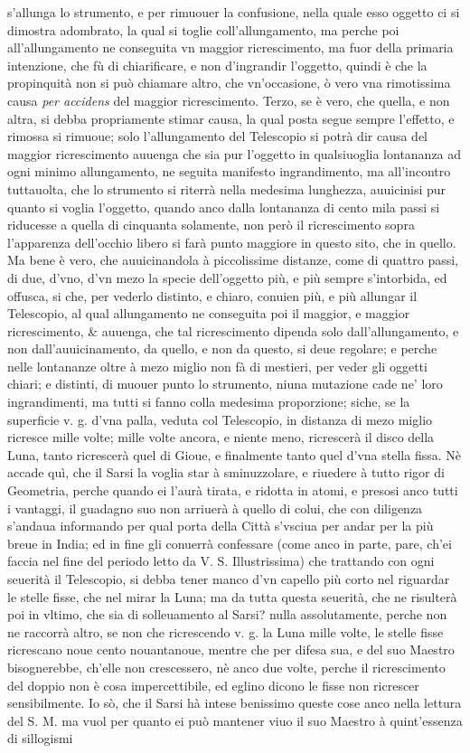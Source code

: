 \documentclass[11pt,twoside,openany]{book}
\begin{document}
s'allunga lo strumento, e per rimuouer la confusione, nella quale esso oggetto ci si dimostra adombrato, la qual si toglie coll'allungamento, ma perche poi all'allungamento ne conseguita vn maggior ricrescimento, ma fuor della primaria intenzione, che fù di chiarificare, e non d'ingrandir l'oggetto, quindi è che la propinquità non si può chiamare altro, che vn'occasione, ò vero vna rimotissima causa \textit{per accidens} del maggior ricrescimento. Terzo, se è vero, che quella, e non altra, si debba propriamente stimar causa, la qual posta segue sempre l'effetto, e rimossa si rimuoue; solo l'allungamento del Telescopio si potrà dir causa del maggior ricrescimento auuenga che sia pur l'oggetto in qualsiuoglia lontananza ad ogni minimo allungamento, ne seguita manifesto ingrandimento, ma all'incontro tuttauolta, che lo strumento si riterrà nella medesima lunghezza, auuicinisi pur quanto si voglia l'oggetto, quando anco dalla lontananza di cento mila passi si riducesse a quella di cinquanta solamente, non però il ricrescimento sopra l'apparenza dell'occhio libero si farà punto maggiore in questo sito, che in quello. Ma bene è vero, che auuicinandola à piccolissime distanze, come di quattro passi, di due, d'vno, d'vn mezo la specie dell'oggetto più, e più sempre s'intorbida, ed offusca, si che, per vederlo distinto, e chiaro, conuien più, e più allungar il Telescopio, al qual allungamento ne conseguita poi il maggior, e maggior ricrescimento, \& auuenga, che tal ricrescimento dipenda solo dall'allungamento, e non dall'auuicinamento, da quello, e non da questo, si deue regolare; e perche nelle lontananze oltre à mezo miglio non fà di mestieri, per veder gli oggetti chiari; e distinti, di muouer punto lo strumento, niuna mutazione cade ne' loro ingrandimenti, ma tutti si fanno colla medesima proporzione; siche, se la superficie v. g. d'vna palla, veduta col Telescopio, in distanza di mezo miglio ricresce mille volte; mille volte ancora, e niente meno, ricrescerà il disco della Luna, tanto ricrescerà quel di Gioue, e finalmente tanto quel d'vna stella fissa. Nè accade quì, che il Sarsi la voglia star à sminuzzolare, e riuedere à tutto rigor di Geometria, perche quando ei l'aurà tirata, e ridotta in atomi, e presosi anco tutti i vantaggi, il guadagno suo non arriuerà à quello di colui, che con diligenza s'andaua informando per qual porta della Città s'vsciua per andar per la più breue in India; ed in fine gli conuerrà confessare (come anco in parte, pare, ch'ei faccia nel fine del periodo letto da V. S. Illustrissima) che trattando con ogni seuerità il Telescopio, si debba tener manco d'vn capello più corto nel riguardar le stelle fisse, che nel mirar la Luna; ma da tutta questa seuerità, che ne risulterà poi in vltimo, che sia di solleuamento al Sarsi? nulla assolutamente, perche non ne raccorrà altro, se non che ricrescendo v. g. la Luna mille volte, le stelle fisse ricrescano noue cento nouantanoue, mentre che per difesa sua, e del suo Maestro bisognerebbe, ch'elle non crescessero, nè anco due volte, perche il ricrescimento del doppio non è cosa impercettibile, ed eglino dicono le fisse non ricrescer sensibilmente. Io sò, che il Sarsi hà intese benissimo queste cose anco nella lettura del S. M. ma vuol per quanto ei può mantener viuo il suo Maestro à quint'essenza di sillogismi 
\end{document}
